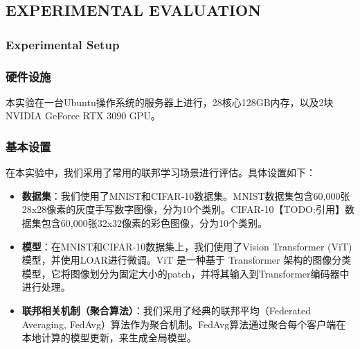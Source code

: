 \documentclass[lettersize,journal]{IEEEtran}
\begin{document}



\subsection{EXPERIMENTAL EVALUATION}

\subsubsection{Experimental Setup}

\subsubsection{硬件设施}

本实验在一台Ubuntu操作系统的服务器上进行，28核心128GB内存，以及2块NVIDIA GeForce RTX 3090 GPU。

\subsubsection{基本设置}

在本实验中，我们采用了常用的联邦学习场景进行评估。具体设置如下：

\begin{itemize}
    \item \textbf{数据集}：我们使用了MNIST和CIFAR-10数据集。MNIST数据集包含60,000张28x28像素的灰度手写数字图像，分为10个类别。CIFAR-10【TODO:引用】数据集包含60,000张32x32像素的彩色图像，分为10个类别。
    
    \item \textbf{模型}：在MNIST和CIFAR-10数据集上，我们使用了Vision Transformer (ViT) 模型，并使用LOAR进行微调。ViT 是一种基于 Transformer 架构的图像分类模型，它将图像划分为固定大小的patch，并将其输入到Transformer编码器中进行处理。
    
    \item \textbf{联邦相关机制（聚合算法）}：我们采用了经典的联邦平均（Federated Averaging, FedAvg）算法作为聚合机制。FedAvg算法通过聚合每个客户端在本地计算的模型更新，来生成全局模型。
    
\end{itemize}
\end{document}
